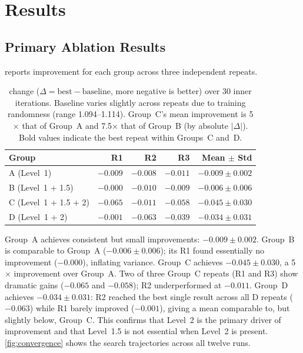 \section{Results}
\label{sec:results}

\subsection{Primary Ablation Results}

 reports \valbpb{} improvement for each group across three
independent repeats.

\begin{table}[!htbp]
\centering
\caption{%
  \valbpb{} change ($\Delta = \text{best} - \text{baseline}$, more negative
  is better) over 30 inner iterations.
  Baseline \valbpb{} varies slightly across repeats due to training
  randomness (range 1.094--1.114).
  Group~C's mean improvement is 5$\times$ that of Group~A and 7.5$\times$ that
  of Group~B (by absolute $|\Delta|$).
  Bold values indicate the best repeat within Groups~C and~D.%
}
\label{tab:main}
\begin{tabular}{@{}lrrrr@{}}
\toprule
Group & R1 & R2 & R3 & Mean $\pm$ Std \\
\midrule
A (Level~1)         & $-0.009$ & $-0.008$ & $-0.011$ & $-0.009 \pm 0.002$ \\
B (Level~1 + 1.5)   & $-0.000$ & $-0.010$ & $-0.009$ & $-0.006 \pm 0.006$ \\
C (Level~1 + 1.5 + 2) & $\mathbf{-0.065}$ & $-0.011$ & $\mathbf{-0.058}$ & $\mathbf{-0.045 \pm 0.030}$ \\
D (Level~1 + 2) & $-0.001$ & $\mathbf{-0.063}$ & $-0.039$ & $-0.034 \pm 0.031$ \\
\bottomrule
\end{tabular}
\end{table}

Group~A achieves consistent but small improvements: $-0.009 \pm 0.002$.
Group~B is comparable to Group~A ($-0.006 \pm 0.006$); its R1 found
essentially no improvement ($-0.000$), inflating variance.
Group~C achieves $-0.045 \pm 0.030$, a 5$\times$ improvement over Group~A.
Two of three Group~C repeats (R1 and R3) show dramatic gains ($-0.065$ and
$-0.058$); R2 underperformed at $-0.011$.
Group~D achieves $-0.034 \pm 0.031$: R2 reached the best single result
across all D repeats ($-0.063$) while R1 barely improved ($-0.001$), giving
a mean comparable to, but slightly below, Group~C.
This confirms that Level~2 is the primary driver of improvement and that
Level~1.5 is not essential when Level~2 is present.
\cref{fig:convergence} shows the search trajectories across all twelve runs.

